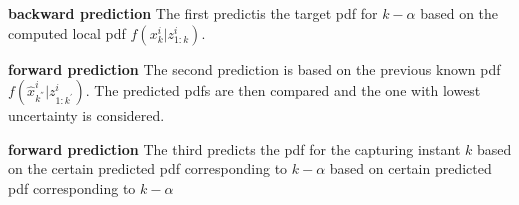 \documentclass[a4paper, 11pt]{article}
\begin{document}
\begin{CJK}{UTF8}{gbsn}
\textbf{backward prediction} The first predictis the target pdf for $k-\alpha$ based on the computed local pdf $f(x_k^i|z_{1:k}^i)$.

\textbf{forward prediction} The second prediction is based on the previous known pdf $f(\hat{x}_{k^{''}}^i | z_{1:k^{'}}^i)$. The predicted pdfs are then compared and the one with lowest uncertainty is considered.

\textbf{forward prediction} The third predicts the pdf for the capturing instant $k$ based on the certain predicted pdf corresponding to $k-\alpha$ based on certain predicted pdf corresponding to $k-\alpha$


\end{CJK}
\end{document}
